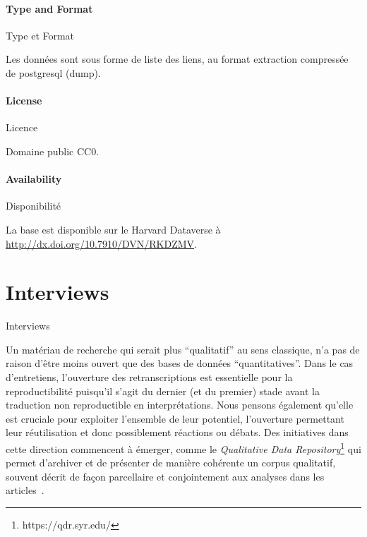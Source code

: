\paragraph{Type and Format}{Type et Format}

Les données sont sous forme de liste des liens, au format extraction compressée de postgresql (dump).

\paragraph{License}{Licence}

Domaine public CC0.

\paragraph{Availability}{Disponibilité}

La base est disponible sur le Harvard Dataverse à \url{http://dx.doi.org/10.7910/DVN/RKDZMV}.











\section{Interviews}{Interviews}

\label{app:sec:interviews}


Un matériau de recherche qui serait plus ``qualitatif'' au sens classique, n'a pas de raison d'être moins ouvert que des bases de données ``quantitatives''. Dans le cas d'entretiens, l'ouverture des retranscriptions est essentielle pour la reproductibilité puisqu'il s'agit du dernier (et du premier) stade avant la traduction non reproductible en interprétations. Nous pensons également qu'elle est cruciale pour exploiter l'ensemble de leur potentiel, l'ouverture permettant leur réutilisation et donc possiblement réactions ou débats. Des initiatives dans cette direction commencent à émerger, comme le \emph{Qualitative Data Repository}\footnote{https://qdr.syr.edu/} qui permet d'archiver et de présenter de manière cohérente un corpus qualitatif, souvent décrit de façon parcellaire et conjointement aux analyses dans les articles~\cite{elman_kapiszewski_2018}.



